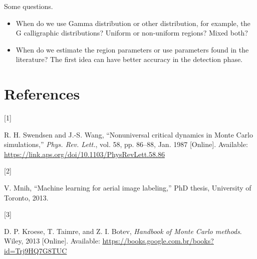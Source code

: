 \documentclass[
  journal,
]{IEEEtran}%
\newlength{\cslhangindent}
\newlength{\csllabelwidth}
\newenvironment{CSLReferences}[2] %
 {\begin{list}{}{%
  \setlength{\itemindent}{0pt}
  \setlength{\leftmargin}{0pt}
  \setlength{\parsep}{0pt}
  \ifodd #1
   \setlength{\leftmargin}{\cslhangindent}
   \setlength{\itemindent}{-1\cslhangindent}
  \fi
  \setlength{\itemsep}{#2\baselineskip}}}
 {\end{list}}
\newcommand{\CSLLeftMargin}[1]{\parbox[t]{\csllabelwidth}{\strut#1\strut}}
\newcommand{\CSLRightInline}[1]{\parbox[t]{\linewidth - \csllabelwidth}{\strut#1\strut}}
\begin{document}
Some questions.

\begin{itemize}
\item When do we use Gamma distribution or other distribution, for example, the G calligraphic distributions? Uniform or non-uniform regions? Mixed both?
\item When do we estimate the region parameters or use parameters found in the literature? The first idea can have better accuracy in the detection phase.
\end{itemize}

\begin{figure}


\caption{\label{fig-6}}

\end{figure}%

\section*{References}\label{references}

\label{refs}
\begin{CSLReferences}{0}{0}
\CSLLeftMargin{{[}1{]} }%
\CSLRightInline{R. H. Swendsen and J.-S. Wang, {``Nonuniversal critical
dynamics in {M}onte {C}arlo simulations,''} \emph{Phys. Rev. Lett.},
vol. 58, pp. 86--88, Jan. 1987 {[}Online{]}. Available:
\url{https://link.aps.org/doi/10.1103/PhysRevLett.58.86}}

\CSLLeftMargin{{[}2{]} }%
\CSLRightInline{V. Mnih, {``Machine learning for aerial image
labeling,''} PhD thesis, University of Toronto, 2013. }

\CSLLeftMargin{{[}3{]} }%
\CSLRightInline{D. P. Kroese, T. Taimre, and Z. I. Botev, \emph{Handbook
of {M}onte {C}arlo methods}. Wiley, 2013 {[}Online{]}. Available:
\url{https://books.google.com.br/books?id=Trj9HQ7G8TUC}}

\end{CSLReferences}
\end{document}
